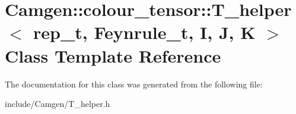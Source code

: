\hypertarget{a00540}{}\section{Camgen\+:\+:colour\+\_\+tensor\+:\+:T\+\_\+helper$<$ rep\+\_\+t, Feynrule\+\_\+t, I, J, K $>$ Class Template Reference}
\label{a00540}


The documentation for this class was generated from the following file\+:\begin{DoxyCompactItemize}
\item 
include/\+Camgen/T\+\_\+helper.\+h\end{DoxyCompactItemize}
